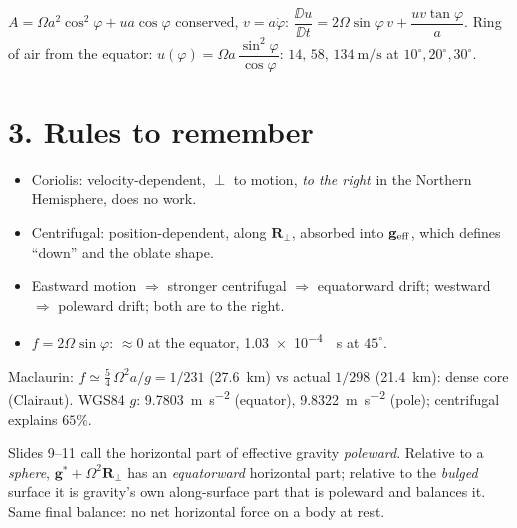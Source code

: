 \documentclass[10pt]{article}
\begin{document}
\begin{derivbox}
$A=\Omega a^2\cos^2\varphi+ua\cos\varphi$ conserved, $v=a\dot\varphi$:\quad
$\dfrac{\DD u}{\DD t}=2\Omega\sin\varphi\,v+\dfrac{uv\tan\varphi}{a}$.\quad
Ring of air from the equator: $u(\varphi)=\Omega a\,\dfrac{\sin^2\varphi}{\cos\varphi}$: $14,\,58,\,134\ \si{\metre\per\second}$ at $10^\circ,20^\circ,30^\circ$.
\end{derivbox}

\section*{3. Rules to remember}
\begin{itemize}[leftmargin=*,itemsep=1pt]
\item Coriolis: velocity-dependent, $\perp$ to motion, \emph{to the right} in the Northern Hemisphere, does no work.
\item Centrifugal: position-dependent, along $\mathbf R_\perp$, absorbed into $\mathbf g_{\rm eff}$, which defines ``down'' and the oblate shape.
\item Eastward motion $\Rightarrow$ stronger centrifugal $\Rightarrow$ equatorward drift; westward $\Rightarrow$ poleward drift; both are to the right.
\item $f=2\Omega\sin\varphi$: $\approx 0$ at the equator, \SI{1.03e-4}{\per\second} at $45^\circ$.
\end{itemize}

\begin{extrabox}
Maclaurin: $f\simeq\tfrac54\,\Omega^2a/g=1/231$ (\SI{27.6}{km}) vs actual $1/298$ (\SI{21.4}{km}): dense core (Clairaut). WGS84 $g$: \SI{9.7803}{\metre\per\second\squared} (equator), \SI{9.8322}{\metre\per\second\squared} (pole); centrifugal explains $65\%$.
\end{extrabox}

\begin{verifybox}
Slides 9--11 call the horizontal part of effective gravity \emph{poleward}. Relative to a \emph{sphere}, $\mathbf g^*+\Omega^2\mathbf R_\perp$ has an \emph{equatorward} horizontal part; relative to the \emph{bulged} surface it is gravity's own along-surface part that is poleward and balances it. Same final balance: no net horizontal force on a body at rest.
\end{verifybox}
\end{document}
